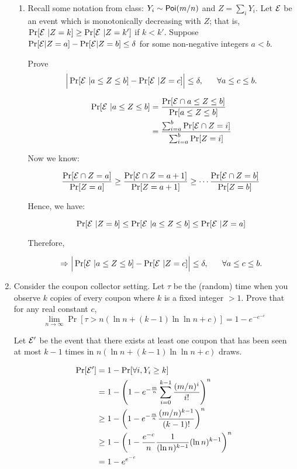 \documentclass[11pt]{article}
\def\Poi{{\sf Poi}}
\begin{document}
\begin{enumerate}
\begin{enumerate}
\item Recall some notation from class: $Y_i \sim \Poi(m/n)$ and $Z = \sum_i Y_i$. Let ${\cal E}$ be an event which is monotonically decreasing with $Z$; that is, $\Pr[{\cal E}~|Z=k] \geq \Pr[{\cal E}~|Z=k']$ if $k < k'$. Suppose $\Pr[{\cal E}|Z=a] - \Pr[{\cal E}|Z=b] \leq \delta$ for some non-negative integers $a < b$. 

Prove
\[
\Big| \Pr[{\cal E}~|a \leq Z \leq b ]  - \Pr[{\cal E}~|Z = c] \Big| \leq \delta, ~~~~~\forall a\leq c\leq b.
\]

\Sol

\begin{align*}
 \Pr[{\cal E}~|a\leq Z\leq b] &= \frac{\Pr[{\cal E} \cap a\leq Z\leq b]}{\Pr[a\leq Z\leq b]}\\
 &= \frac{\sum_{i=a}^b \Pr[{\cal E} \cap Z=i]}{\sum_{i=a}^b \Pr[Z=i]}
\end{align*}

Now we know:

\[ \frac{\Pr[{\cal E} \cap Z=a]}{\Pr[Z=a]} \geq \frac{\Pr[{\cal E} \cap Z=a+1]}{\Pr[Z=a+1]}\geq \cdots \frac{\Pr[{\cal E} \cap Z=b]}{\Pr[Z=b]}\]

Hence, we have:

\[ \Pr[{\cal E} ~| Z=b] \leq \Pr[{\cal E} ~| a \leq Z\leq b] \leq \Pr[{\cal E} ~| Z=a] \]

Therefore,

\[
\Rightarrow \Big| \Pr[{\cal E}~|a \leq Z \leq b ]  - \Pr[{\cal E}~|Z = c] \Big| \leq \delta, ~~~~~\forall a\leq c\leq b.
\]

\end{enumerate}


\item Consider the coupon collector setting. Let $\tau$ be the (random) time when you observe $k$ copies of every coupon where $k$ is a fixed integer $> 1$.
Prove that for any real constant $c$,
\[\lim_{n\to \infty} \Pr[\tau > n\left(\ln n + (k-1)\ln\ln n + c\right)] = 1 - e^{-e^{-c}}\]

\Sol

Let ${\cal E}'$ be the event that there exists at least one coupon that has been seen at most $k-1$ times in $n\left(\ln n + (k-1)\ln\ln n + c\right)$ draws.

\begin{align*}
 \Pr[{\cal E}'] &= 1 - \Pr[\forall i, Y_i \ge k]\\
	     &= 1 - \left(1 - e^{-\frac{m}{n}} \sum_{i=0}^{k-1} \frac{(m/n)^i}{i!} \right)^n\\
	     &\ge 1 - \left(1- e^{-\frac{m}{n}} \frac{(m/n)^{k-1}}{(k-1)!} \right)^n\\
	     &\ge 1 - \left(1 - \frac{e^{-c}}{n} \frac{1}{(\ln n)^{k-1}} (\ln n)^{k-1}	     \right)^n\\
	     &= 1 - e^{e^{-c}}
\end{align*}


\end{enumerate}
\end{document}
